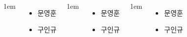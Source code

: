 \documentclass[	20pt, 
							a1paper, 
							portrait, %
							margin=0mm, %
							innermargin=10mm,  		%
							colspace=5mm, 
							subcolspace=0mm
							]{tikzposter}
\begin{document}
\begin{columns}
			{
					\setlength{\leftmargini}{4em}
					\setlength{\labelsep} {1em}
					\begin{itemize}
					\item  문영훈 
					\item  구인규 
					\end{itemize}
			} %


			{
					\setlength{\leftmargini}{4em}
					\setlength{\labelsep} {1em}
					\begin{itemize}
					\item  문영훈 
					\item  구인규 
					\end{itemize}
			} %

			{
					\setlength{\leftmargini}{4em}
					\setlength{\labelsep} {1em}
					\begin{itemize}
					\item  문영훈 
					\item  구인규 
					\end{itemize}
			} %




	\end{columns}
\end{document}
